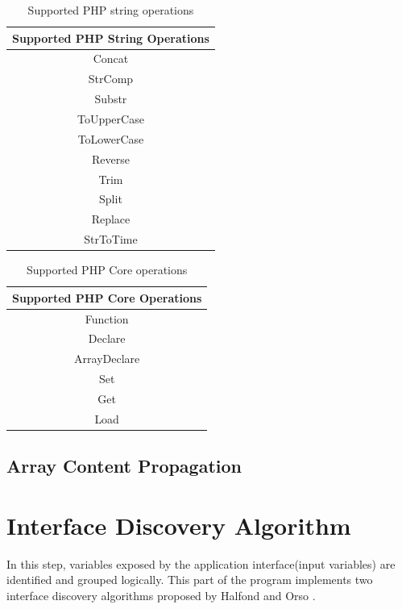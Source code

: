 \begin{table}
\centering
\begin{tabular}{c}
Supported PHP String Operations \\
\hline
Concat \\
StrComp \\
Substr \\
ToUpperCase \\
ToLowerCase \\
Reverse \\
Trim \\
Split \\
Replace \\
StrToTime \\
\end{tabular}
\caption{Supported PHP string operations}
\label{tab:a}
\end{table}

\begin{table}
\centering
\begin{tabular}{c}
Supported PHP Core Operations \\
\hline
Function \\
Declare \\
ArrayDeclare \\
Set \\
Get \\
Load \\
\end{tabular}
\caption{Supported PHP Core operations}
\label{tab:b}
\end{table}

\subsection{Array Content Propagation}
\blindtext

\section{Interface Discovery Algorithm}
In this step, variables exposed by the application interface(input variables) are identified and grouped logically. This part of the program implements two interface discovery algorithms proposed by Halfond and Orso \cite{ref3}.

